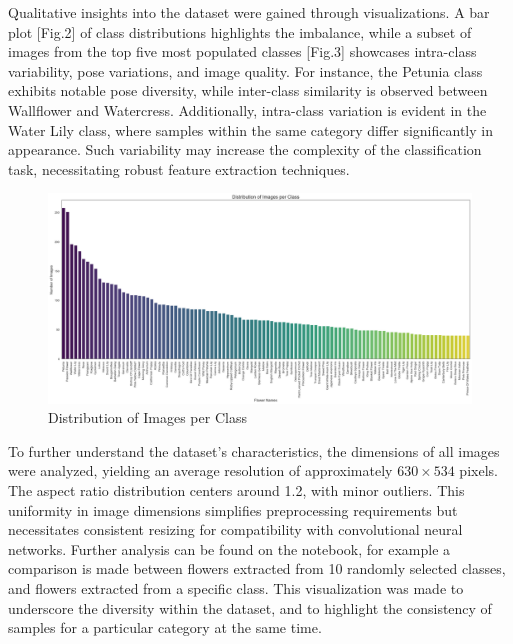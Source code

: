 \vspace{0.3cm}

Qualitative insights into the dataset were gained through visualizations. A bar plot [Fig.2] of class distributions highlights
the imbalance, while a subset of images from the top five most populated classes [Fig.3] showcases intra-class variability,
pose variations, and image quality. For instance, the Petunia class exhibits notable pose diversity, while inter-class
similarity is observed between Wallflower and Watercress. Additionally, intra-class variation is evident in the Water
Lily class, where samples within the same category differ significantly in appearance. Such variability may increase
the complexity of the classification task, necessitating robust feature extraction techniques.

\begin{figure}[h!]
    \centering
    \includegraphics[width=\linewidth]{Images/Distribution of Images per Class}
    \caption{Distribution of Images per Class}
\end{figure}

\vspace{0.3cm}

To further understand the dataset's characteristics, the dimensions of all images were analyzed, yielding an average
resolution of approximately \(630 \times 534\) pixels. The aspect ratio distribution centers around 1.2, with minor
outliers. This uniformity in image dimensions simplifies preprocessing requirements but necessitates consistent
resizing for compatibility with convolutional neural networks. Further analysis can be found on the notebook,
for example a comparison is made between flowers extracted from 10 randomly selected classes, and flowers extracted from
a specific class. This visualization was made to underscore the diversity within the dataset, and to highlight
the consistency of samples for a particular category at the same time.

